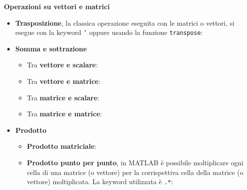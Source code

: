 \documentclass[a4paper]{article}
\begin{document}
    \begin{flushleft}
        \large
        \textcolor{Red3}{\textbf{Operazioni su vettori e matrici}}
    \end{flushleft}
    \begin{itemize}
        \item \textbf{Trasposizione}, la classica operazione eseguita con le matrici o vettori, si esegue con la keyword \texttt{'} oppure usando la funzione \texttt{transpose}:
        

        \item \textbf{Somma e sottrazione}
        \begin{itemize}
            \item Tra \textbf{vettore e scalare}:
            

            \item Tra \textbf{vettore e matrice}:
            

            \item Tra \textbf{matrice e scalare}:
            

            \item Tra \textbf{matrice e matrice}:
            
        \end{itemize}

        \item \textbf{Prodotto}
        \begin{itemize}
            \item \textbf{Prodotto matriciale}:
            

            \item \textbf{Prodotto punto per punto}, in MATLAB è possibile moltiplicare ogni cella di una matrice (o vettore) per la corrispettiva cella della matrice (o vettore) moltiplicata. La keyword utilizzata è \texttt{.*}:
            
        \end{itemize}


\end{itemize}
\end{document}
